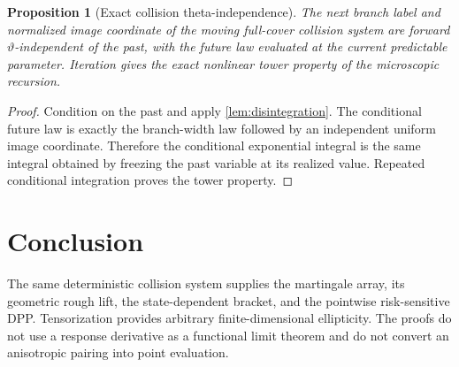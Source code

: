 \documentclass[11pt,reqno]{amsart}
\newtheorem{proposition}[theorem]{Proposition}
\theoremstyle{definition}
\begin{document}
\begin{proposition}[Exact collision theta-independence]\label{prop:theta-independent}
The next branch label and normalized image coordinate of the moving full-cover
collision system are forward $\vartheta$-independent of the past, with the
future law evaluated at the current predictable parameter.  Iteration gives
the exact nonlinear tower property of the microscopic recursion.
\end{proposition}

\begin{proof}
Condition on the past and apply \cref{lem:disintegration}.  The conditional
future law is exactly the branch-width law followed by an independent uniform
image coordinate.  Therefore the conditional exponential integral is the
same integral obtained by freezing the past variable at its realized value.
Repeated conditional integration proves the tower property.
\end{proof}

\section{Conclusion}

The same deterministic collision system supplies the martingale array, its
geometric rough lift, the state-dependent bracket, and the pointwise
risk-sensitive DPP.  Tensorization provides arbitrary finite-dimensional
ellipticity.  The proofs do not use a response derivative as a functional
limit theorem and do not convert an anisotropic pairing into point evaluation.



\end{document}
